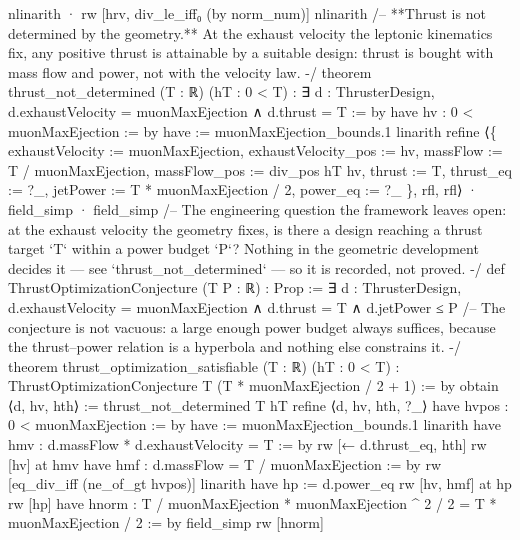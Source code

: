 \documentclass[11pt,a4paper]{article}
\begin{document}
{    nlinarith
  · rw [hrv, div\_\allowbreak{}le\_\allowbreak{}iff₀ (by norm\_\allowbreak{}num)]
    nlinarith
\mbox{}
/-- **Thrust is not determined by the geometry.**  At the exhaust velocity the
leptonic kinematics fix, any positive thrust is attainable by a suitable design:
thrust is bought with mass flow and power, not with the velocity law. -/
theorem thrust\_\allowbreak{}not\_\allowbreak{}determined (T : ℝ) (hT : 0 \textless{} T) :
    ∃ d : ThrusterDesign, d.exhaustVelocity = muonMaxEjection ∧ d.thrust = T := by
  have hv : 0 \textless{} muonMaxEjection := by
    have := muonMaxEjection\_\allowbreak{}bounds.1
    linarith
  refine ⟨\{ exhaustVelocity := muonMaxEjection, exhaustVelocity\_\allowbreak{}pos := hv,
            massFlow := T / muonMaxEjection, massFlow\_\allowbreak{}pos := div\_\allowbreak{}pos hT hv,
            thrust := T, thrust\_\allowbreak{}eq := ?\_\allowbreak{}, jetPower := T * muonMaxEjection / 2,
            power\_\allowbreak{}eq := ?\_\allowbreak{} \}, rfl, rfl⟩
  · field\_\allowbreak{}simp
  · field\_\allowbreak{}simp
\mbox{}
/-- The engineering question the framework leaves open: at the exhaust velocity
the geometry fixes, is there a design reaching a thrust target `T` within a
power budget `P`?  Nothing in the geometric development decides it — see
`thrust\_\allowbreak{}not\_\allowbreak{}determined` — so it is recorded, not proved. -/
def ThrustOptimizationConjecture (T P : ℝ) : Prop :=
  ∃ d : ThrusterDesign, d.exhaustVelocity = muonMaxEjection ∧ d.thrust = T ∧ d.jetPower ≤ P
\mbox{}
/-- The conjecture is not vacuous: a large enough power budget always suffices,
because the thrust–power relation is a hyperbola and nothing else constrains it. -/
theorem thrust\_\allowbreak{}optimization\_\allowbreak{}satisfiable (T : ℝ) (hT : 0 \textless{} T) :
    ThrustOptimizationConjecture T (T * muonMaxEjection / 2 + 1) := by
  obtain ⟨d, hv, hth⟩ := thrust\_\allowbreak{}not\_\allowbreak{}determined T hT
  refine ⟨d, hv, hth, ?\_\allowbreak{}⟩
  have hvpos : 0 \textless{} muonMaxEjection := by
    have := muonMaxEjection\_\allowbreak{}bounds.1
    linarith
  have hmv : d.massFlow * d.exhaustVelocity = T := by
    rw [← d.thrust\_\allowbreak{}eq, hth]
  rw [hv] at hmv
  have hmf : d.massFlow = T / muonMaxEjection := by
    rw [eq\_\allowbreak{}div\_\allowbreak{}iff (ne\_\allowbreak{}of\_\allowbreak{}gt hvpos)]
    linarith
  have hp := d.power\_\allowbreak{}eq
  rw [hv, hmf] at hp
  rw [hp]
  have hnorm : T / muonMaxEjection * muonMaxEjection \textasciicircum{} 2 / 2 = T * muonMaxEjection / 2 := by
    field\_\allowbreak{}simp
  rw [hnorm]
}
\end{document}
